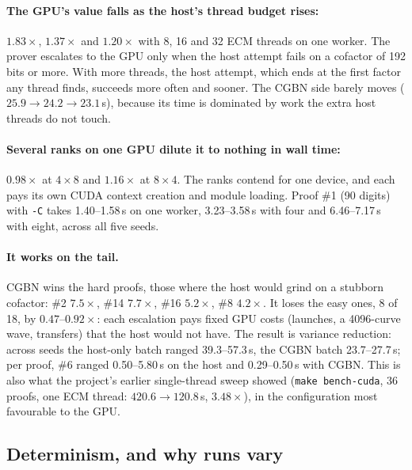 \documentclass[11pt,a4paper]{article}
\newcommand{\code}[1]{\texttt{#1}}
\begin{document}
\paragraph{The GPU's value falls as the host's thread budget rises:}
$1.83\times$, $1.37\times$ and $1.20\times$ with 8, 16 and 32 ECM threads
on one worker. The prover escalates to the GPU only when the host attempt
fails on a cofactor of 192 bits or more. With more threads, the host
attempt, which ends at the first factor any thread finds, succeeds more
often and sooner. The CGBN side barely moves ($25.9 \to 24.2 \to
23.1$\,s), because its time is dominated by work the extra host threads do
not touch.

\paragraph{Several ranks on one GPU dilute it to nothing in wall time:}
$0.98\times$ at $4 \times 8$ and $1.16\times$ at $8 \times 4$. The ranks
contend for one device, and each pays its own CUDA context creation and
module loading. Proof \#1 (90 digits) with \code{-C} takes 1.40--1.58\,s on
one worker, 3.23--3.58\,s with four and 6.46--7.17\,s with eight, across all
five seeds.

\paragraph{It works on the tail.} CGBN wins the hard proofs, those where
the host would grind on a stubborn cofactor: \#2 $7.5\times$, \#14
$7.7\times$, \#16 $5.2\times$, \#8 $4.2\times$. It loses the easy ones, 8 of
18, by $0.47$--$0.92\times$: each escalation pays fixed GPU costs
(launches, a 4096-curve wave, transfers) that the host would not have. The
result is variance reduction: across seeds the host-only batch ranged
39.3--57.3\,s, the CGBN batch 23.7--27.7\,s; per proof, \#6 ranged
0.50--5.80\,s on the host and 0.29--0.50\,s with CGBN. This is also what the
project's earlier single-thread sweep showed (\code{make bench-cuda}, 36
proofs, one ECM thread: $420.6 \to 120.8$\,s, $3.48\times$), in the
configuration most favourable to the GPU.

\subsection{Determinism, and why runs vary}
\end{document}
